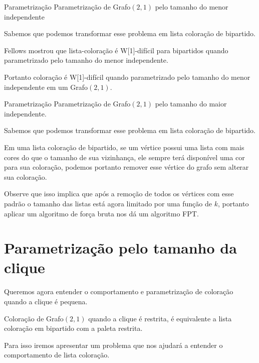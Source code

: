 \documentclass[9pt, compress]{beamer}
\newcommand{\?}{\textcolor{warn}{\textit{?}}}
\begin{document}
    \begin{frame}{Parametrização}
      \large{Parametrização de Grafo$(2,1)$ pelo tamanho do menor independente}
      \normalsize\newline\newline
            
      Sabemos que podemos transformar esse problema em lista coloração de bipartido.
      
      Fellows mostrou que lista-coloração é W[1]-difícil para bipartidos quando parametrizado pelo tamanho do menor independente.\cite{fellows07}
      
      Portanto coloração é W[1]-difícil quando parametrizado pelo tamanho do menor independente em um Grafo$(2,1)$.
    \end{frame}
    \begin{frame}{Parametrização}
    \large{Parametrização de Grafo$(2,1)$ pelo tamanho do maior independente.}
      \normalsize\newline\newline
            
      Sabemos que podemos transformar esse problema em lista coloração de bipartido.
      
      Em uma lista coloração de bipartido, se um vértice possui uma lista com mais cores do que o tamanho de sua vizinhança, ele sempre terá disponível uma cor para sua coloração, podemos portanto remover esse vértice do grafo sem alterar sua coloração.
      
      Observe que isso implica que após a remoção de todos os vértices com esse padrão o tamanho das listas está agora limitado por uma função de $k$, portanto aplicar um algoritmo de força bruta nos dá um algoritmo FPT.
     \end{frame}
     
    \section{Parametrização pelo tamanho da clique}
     \begin{frame}
       Queremos agora entender o comportamento e parametrização de coloração quando a clique é pequena.
       
       Coloração de Grafo$(2,1)$ quando a clique é restrita, é equivalente a lista coloração em bipartido com a paleta restrita.
       
       Para isso iremos apresentar um problema que nos ajudará a entender o comportamento de lista coloração.
     \end{frame}
    
\end{document}
